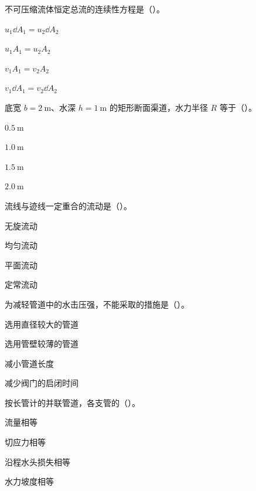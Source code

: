 \begin{ti}
\item 不可压缩流体恒定总流的连续性方程是（\quad）。
\begin{choices}
\item $u_1\dd A_1=u_2\dd A_2$
\item $u_1A_1=u_2A_2$
\item $v_1A_1=v_2A_2$
\item $v_1\dd A_1=v_2\dd A_2$
\end{choices}

\item 底宽 $b=2\ \mathrm{m}$、水深 $h=1\ \mathrm{m}$ 的矩形断面渠道，水力半径 $R$ 等于（\quad）。
\begin{choices}
\item $0.5\ \mathrm{m}$
\item $1.0\ \mathrm{m}$
\item $1.5\ \mathrm{m}$
\item $2.0\ \mathrm{m}$
\end{choices}

\item 流线与迹线一定重合的流动是（\quad）。
\begin{choices}
\item 无旋流动
\item 均匀流动
\item 平面流动
\item 定常流动
\end{choices}

\item 为减轻管道中的水击压强，不能采取的措施是（\quad）。
\begin{choices}
\item 选用直径较大的管道
\item 选用管壁较薄的管道
\item 减小管道长度
\item 减少阀门的启闭时间
\end{choices}

\item 按长管计的并联管道，各支管的（\quad）。
\begin{choices}
\item 流量相等
\item 切应力相等
\item 沿程水头损失相等
\item 水力坡度相等
\end{choices}


\end{ti}
